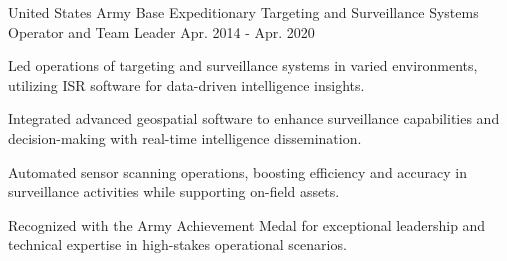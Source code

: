 \begin{cventries}
  \cventry
    {United States Army} %
    {Base Expeditionary Targeting and Surveillance Systems Operator and Team Leader} %
    {} %
    {Apr. 2014 - Apr. 2020} %
    {
      \begin{cvitems} %
      \item {Led operations of targeting and surveillance systems in varied environments, utilizing ISR software for data-driven intelligence insights.}
    \item {Integrated advanced geospatial software to enhance surveillance capabilities and decision-making with real-time intelligence dissemination.}
    \item {Automated sensor scanning operations, boosting efficiency and accuracy in surveillance activities while supporting on-field assets.}
    \item {Recognized with the Army Achievement Medal for exceptional leadership and technical expertise in high-stakes operational scenarios.}
      \end{cvitems}
    }
\end{cventries}
